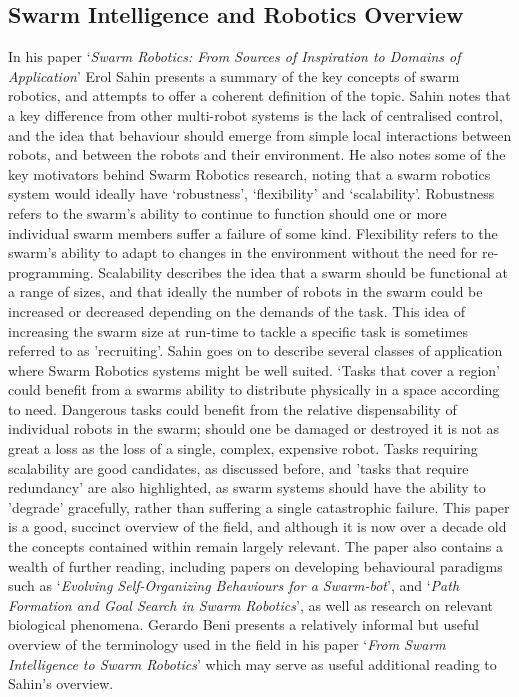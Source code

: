 \documentclass[titlepage,hidelinks,10pt]{article}
\begin{document}
\begin{multicols*}{2}
\subsection{Swarm Intelligence and Robotics Overview} \label{GeneralSR}
In his paper `\textit{Swarm Robotics: From Sources of Inspiration to Domains of Application}' Erol Sahin presents a summary of the key concepts of swarm robotics\cite{InspirationToApplication}, and attempts to offer a coherent definition of the topic. Sahin notes that a key difference from other multi-robot systems is the lack of centralised control, and the idea that behaviour should emerge from simple local interactions between robots, and between the robots and their environment. He also notes some of the key motivators behind Swarm Robotics research, noting that a swarm robotics system would ideally have `robustness', `flexibility' and `scalability'. Robustness refers to the swarm's ability to continue to function should one or more individual swarm members suffer a failure of some kind. Flexibility refers to the swarm's ability to adapt to changes in the environment without the need for re-programming. Scalability describes the idea that a swarm should be functional at a range of sizes, and that ideally the number of robots in the swarm could be increased or decreased depending on the demands of the task. This idea of increasing the swarm size at run-time to tackle a specific task is sometimes referred to as 'recruiting'\cite{Recruiting}. Sahin goes on to describe several classes of application where Swarm Robotics systems might be well suited. `Tasks that cover a region' could benefit from a swarms ability to distribute physically in a space according to need. Dangerous tasks could benefit from the relative dispensability of individual robots in the swarm; should one be damaged or destroyed it is not as great a loss as the loss of a single, complex, expensive robot. Tasks requiring scalability are good candidates, as discussed before, and 'tasks that require redundancy' are also highlighted, as swarm systems should have the ability to 'degrade' gracefully, rather than suffering a single catastrophic failure. This paper is a good, succinct overview of the field, and although it is now over a decade old the concepts contained within remain largely relevant. The paper also contains a wealth of further reading, including papers on developing behavioural paradigms such as `\textit{Evolving Self-Organizing Behaviours for a Swarm-bot}\cite{SelfOrganizing}', and `\textit{Path Formation and Goal Search in Swarm Robotics}\cite{PathFormation}', as well as research on relevant biological phenomena\cite{BacterialSelfOrganization}. Gerardo Beni presents a relatively informal but useful overview of the terminology used in the field in his paper `\textit{From Swarm Intelligence to Swarm Robotics}\cite{FromSIToSR}' which may serve as useful additional reading to Sahin's overview.


\end{multicols*}
\end{document}
